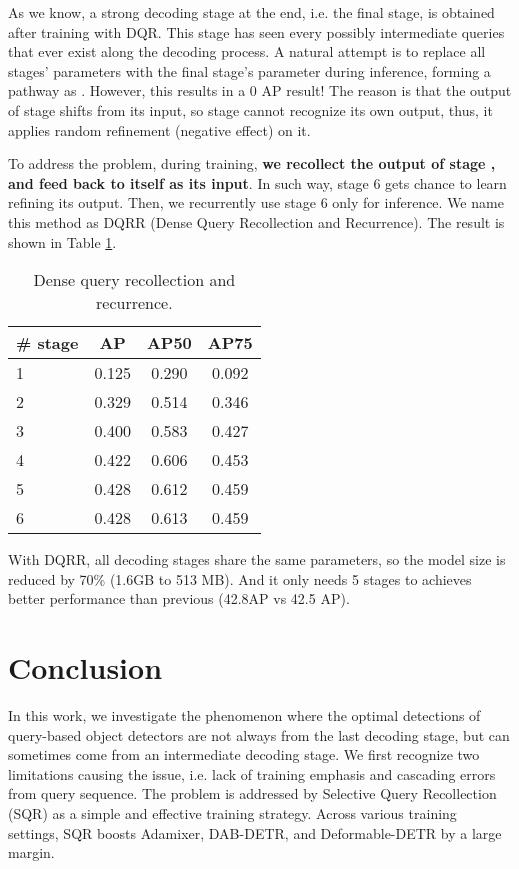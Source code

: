 \documentclass[10pt,twocolumn,letterpaper]{article}
\begin{document}
As we know, a strong decoding stage at the end, i.e. the final stage, is obtained after training with DQR. This stage has seen every possibly intermediate queries that ever exist along the decoding process. A natural attempt is to replace all stages' parameters with the final stage's parameter during inference, forming a pathway as . However, this results in a 0 AP result! The reason is that the output of stage  shifts from its input, so stage  cannot recognize its own output, thus, it applies random refinement (negative effect) on it.

To address the problem, during training, \textbf{we recollect the output of stage , and feed back to itself as its input}. In such way, stage 6 gets chance to learn refining its output. Then, we recurrently use stage 6 only for inference. We name this method as DQRR (Dense Query Recollection and Recurrence). The result is shown in Table \ref{tab:DQRR}.

\begin{table}[t!]
\centering
    \begin{tabular}{l|c|c|c}
    \toprule[1pt]
        \# stage  &  AP & AP50 & AP75 \\
        \midrule
        1       & 0.125  & 0.290  &  0.092  \\
        2       & 0.329  & 0.514  &  0.346  \\
        3       & 0.400  & 0.583  &  0.427  \\
        4       & 0.422  & 0.606  &  0.453  \\
        5       & 0.428  &  0.612 &  0.459  \\
        6       & 0.428  &  0.613 &  0.459 \\
       \bottomrule
    \end{tabular}
    \caption{Dense query recollection and recurrence.}
    \label{tab:DQRR}
\end{table}

With DQRR, all decoding stages share the same parameters, so the model size is reduced by 70\% (1.6GB to 513 MB). And it only needs 5 stages to achieves better performance than previous (42.8AP vs 42.5 AP).

\section{Conclusion}
\label{sec:conclusion}
In this work, we investigate the phenomenon where the optimal detections of query-based object detectors are not always from the last decoding stage, but can sometimes come from an intermediate decoding stage. We first recognize two limitations causing the issue, i.e. lack of training emphasis and cascading errors from query sequence. The problem is addressed by Selective Query Recollection (SQR) as a simple and effective training strategy.
Across various training settings, SQR boosts Adamixer, DAB-DETR, and Deformable-DETR by a large margin.
\end{document}

